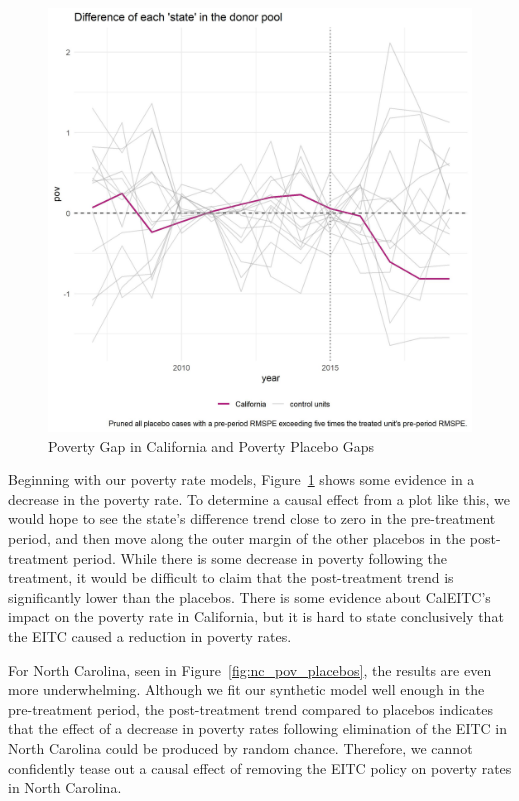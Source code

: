 \documentclass{article}
\begin{document}
 \begin{figure}[H]
    \caption{Poverty Gap in California and Poverty Placebo Gaps}
    \begin{center}
        \includegraphics[width=.85\textwidth]{ca_pov_placebos}
    \end{center}
    \label{fig:ca_pov_placebos}{}
\end{figure}

Beginning with our poverty rate models, Figure~\ref{fig:ca_pov_placebos} shows some evidence in a decrease in the poverty rate. To determine a causal effect from a plot like this, we would hope to see the state's difference trend close to zero in the pre-treatment period, and then move along the outer margin of the other placebos in the post-treatment period. While there is some decrease in poverty following the treatment, it would be difficult to claim that the post-treatment trend is significantly lower than the placebos. There is some evidence about CalEITC's impact on the poverty rate in California, but it is hard to state conclusively that the EITC caused a reduction in poverty rates. 

For North Carolina, seen in Figure~\ref{fig:nc_pov_placebos}, the results are even more underwhelming. Although we fit our synthetic model well enough in the pre-treatment period, the post-treatment trend compared to placebos indicates that the effect of a decrease in poverty rates following elimination of the EITC in North Carolina could be produced by random chance. Therefore, we cannot confidently tease out a causal effect of removing the EITC policy on poverty rates in North Carolina. 
\end{document}
